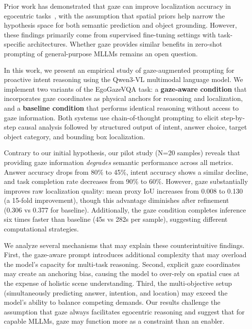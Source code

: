 \documentclass[11pt]{article}
\begin{document}
Prior work has demonstrated that gaze can improve localization accuracy in egocentric tasks~\cite{peng2025eye}, with the assumption that spatial priors help narrow the hypothesis space for both semantic prediction and object grounding. However, these findings primarily come from supervised fine-tuning settings with task-specific architectures. Whether gaze provides similar benefits in zero-shot prompting of general-purpose MLLMs remains an open question.

In this work, we present an empirical study of gaze-augmented prompting for proactive intent reasoning using the Qwen3-VL multimodal language model. We implement two variants of the EgoGazeVQA task: a \textbf{gaze-aware condition} that incorporates gaze coordinates as physical anchors for reasoning and localization, and a \textbf{baseline condition} that performs identical reasoning without access to gaze information. Both systems use chain-of-thought prompting to elicit step-by-step causal analysis followed by structured output of intent, answer choice, target object category, and bounding box localization.

Contrary to our initial hypothesis, our pilot study (N=20 samples) reveals that providing gaze information \emph{degrades} semantic performance across all metrics. Answer accuracy drops from 80\% to 45\%, intent accuracy shows a similar decline, and task completion rate decreases from 90\% to 60\%. However, gaze substantially improves raw localization quality: mean proxy IoU increases from 0.008 to 0.130 (a 15-fold improvement), though this advantage diminishes after refinement (0.306 vs 0.377 for baseline). Additionally, the gaze condition completes inference six times faster than baseline (45s vs 282s per sample), suggesting different computational strategies.

We analyze several mechanisms that may explain these counterintuitive findings. First, the gaze-aware prompt introduces additional complexity that may overload the model's capacity for multi-task reasoning. Second, explicit gaze coordinates may create an anchoring bias, causing the model to over-rely on spatial cues at the expense of holistic scene understanding. Third, the multi-objective setup (simultaneously predicting answer, intention, and location) may exceed the model's ability to balance competing demands. Our results challenge the assumption that gaze always facilitates egocentric reasoning and suggest that for capable MLLMs, gaze may function more as a constraint than an enabler.
\end{document}
